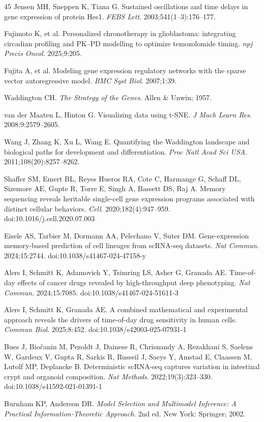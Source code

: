 \documentclass[11pt,letterpaper]{article}
\begin{document}
\begin{thebibliography}{45}
Jensen MH, Sneppen K, Tiana G. Sustained oscillations and time delays in gene expression of protein Hes1. \textit{FEBS Lett}. 2003;541(1--3):176--177.

Fujimoto K, et al. Personalized chronotherapy in glioblastoma: integrating circadian profiling and PK--PD modelling to optimize temozolomide timing. \textit{npj Precis Oncol}. 2025;9:205.

Fujita A, et al. Modeling gene expression regulatory networks with the sparse vector autoregressive model. \textit{BMC Syst Biol}. 2007;1:39.

Waddington CH. \textit{The Strategy of the Genes}. Allen \& Unwin; 1957.

van der Maaten L, Hinton G. Visualizing data using t-SNE. \textit{J Mach Learn Res}. 2008;9:2579--2605.

Wang J, Zhang K, Xu L, Wang E. Quantifying the Waddington landscape and biological paths for development and differentiation. \textit{Proc Natl Acad Sci USA}. 2011;108(20):8257--8262.

Shaffer SM, Emert BL, Reyes Hueros RA, Cote C, Harmange G, Schaff DL, Sizemore AE, Gupte R, Torre E, Singh A, Bassett DS, Raj A. Memory sequencing reveals heritable single-cell gene expression programs associated with distinct cellular behaviors. \textit{Cell}. 2020;182(4):947--959. doi:10.1016/j.cell.2020.07.003

Eisele AS, Tarbier M, Dormann AA, Pelechano V, Suter DM. Gene-expression memory-based prediction of cell lineages from scRNA-seq datasets. \textit{Nat Commun}. 2024;15:2744. doi:10.1038/s41467-024-47158-y

Alers I, Schmitt K, Adamovich Y, Tsimring LS, Asher G, Granada AE. Time-of-day effects of cancer drugs revealed by high-throughput deep phenotyping. \textit{Nat Commun}. 2024;15:7085. doi:10.1038/s41467-024-51611-3

Alers I, Schmitt K, Granada AE. A combined mathematical and experimental approach reveals the drivers of time-of-day drug sensitivity in human cells. \textit{Commun Biol}. 2025;8:452. doi:10.1038/s42003-025-07931-1

Bues J, Bio\v{c}anin M, Pezoldt J, Dainese R, Chrisnandy A, Rezakhani S, Saelens W, Gardeux V, Gupta R, Sarkis R, Russeil J, Saeys Y, Amstad E, Claassen M, Lutolf MP, Deplancke B. Deterministic scRNA-seq captures variation in intestinal crypt and organoid composition. \textit{Nat Methods}. 2022;19(3):323--330. doi:10.1038/s41592-021-01391-1

Burnham KP, Anderson DR. \textit{Model Selection and Multimodel Inference: A Practical Information-Theoretic Approach}. 2nd ed. New York: Springer; 2002.

\end{thebibliography}
\end{document}
